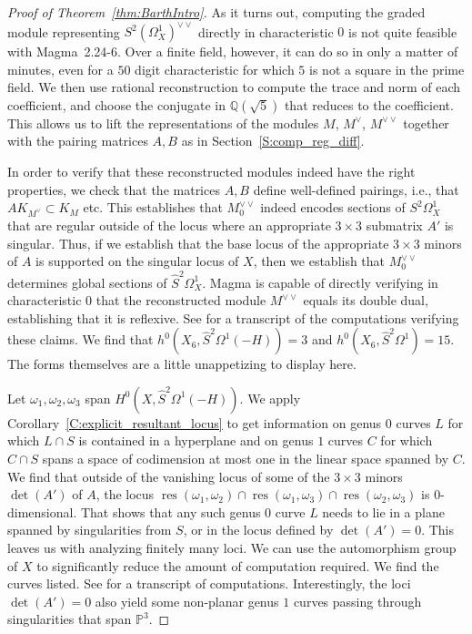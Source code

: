 \documentclass[12pt, reqno]{amsart}
\theoremstyle{definition}
\newcommand{\PP}{{\mathbb P}}
\newcommand{\Q}{{\mathbb Q}}
\DeclareMathOperator{\res}{res}
\numberwithin{equation}{section}
\numberwithin{table}{section}
\begin{document}
\begin{proof}[Proof of Theorem~\ref{thm:BarthIntro}]
As it turns out, computing the graded module representing
$S^2(\Omega^1_X)^{\vee\vee}$ directly in characteristic $0$ is not quite feasible with Magma~2.24-6\cite{magma}. Over a finite field, however, it can do so in only a matter of minutes, even for a $50$ digit characteristic for which $5$ is not a square in the prime field. We then use rational reconstruction to compute the trace and norm of each coefficient, and choose the conjugate in $\Q(\sqrt{5})$ that reduces to the coefficient. This allows us to lift the representations of the modules $M$, $M^\vee$, $M^{\vee\vee}$ together with the pairing matrices $A,B$ as in Section~\ref{S:comp_reg_diff}.

In order to verify that these reconstructed modules indeed have the right properties, we check that the matrices $A,B$ define well-defined pairings, i.e., that $AK_{M^\vee}\subset K_M$ etc.
This establishes that $M^{\vee\vee}_0$ indeed encodes sections of $S^2\Omega^1_X$ that are regular outside of the locus where an appropriate $3\times 3$ submatrix $A'$ is singular. Thus, if we establish that the base locus of the appropriate $3\times 3$ minors of $A$ is supported on the singular locus of $X$, then we establish that $M^{\vee\vee}_0$ determines global sections of $\hat{S}^2 \Omega^1_X$. Magma is capable of directly verifying in characteristic $0$ that the reconstructed module $M^{\vee\vee}$ equals its double dual, establishing that it is reflexive. See \cite{electronic} for a transcript of the computations verifying these claims.
We find that $h^0(X_6,\hat{S}^2\Omega^1(-H))=3$ and $h^0(X_6,\hat{S}^2\Omega^1)=15$. The forms themselves are a little unappetizing to display here. 

Let $\omega_1,\omega_2,\omega_3$ span $H^0(X,\hat{S}^2\Omega^1(-H))$. We apply Corollary~\ref{C:explicit_resultant_locus} to get information on genus $0$ curves $L$ for which $L\cap S$ is contained in a hyperplane and on genus $1$ curves $C$ for which $C\cap S$ spans a space of codimension at most one in the linear space spanned by $C$.  We find that outside of the vanishing locus of some of the $3\times 3$ minors $\det(A')$ of $A$, the locus
$\res(\omega_1,\omega_2)\cap \res(\omega_1,\omega_3)\cap \res(\omega_2,\omega_3)$ is $0$-dimensional. That shows that any such genus $0$ curve $L$ needs to lie in a plane spanned by singularities from $S$, or in the locus defined by $\det(A')=0$. 
This leaves us with analyzing finitely many loci. We can use the automorphism group of $X$ to significantly reduce the amount of computation required. We find the curves listed. See \cite{electronic} for a transcript of computations.
Interestingly, the loci $\det(A')=0$ also yield some non-planar genus $1$ curves passing through singularities that span $\PP^3$.
\end{proof}
\end{document}
